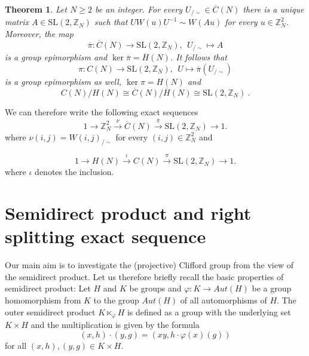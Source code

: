 \documentclass[10pt]{amsart}
\theoremstyle{plain}
\newtheorem{theorem}{Theorem}[section]
\theoremstyle{definition}
\theoremstyle{remark}%
\newcommand{\Z}{\mathbb{Z}}
\newcommand{\Ad}{\mathrm{Ad}}
\newcommand{\SL}{\mathrm{SL}}
\renewcommand{\P}{\mathcal{P}}
\begin{document}
\begin{theorem}\cite{HPPT02}\label{htpp}
Let $N\geq 2$ be an integer. For every $U_{/\sim}\in \overline{C}(N)$ there is a unique matrix $A\in \SL(2,\mathbb{Z}_N)$ such that $UW(u)U^{-1}\sim W(Au)$ for every $u\in\Z_N^2$. Moreover, the map $$\overline{\pi}: \overline{C}(N)\to \SL(2,\mathbb{Z}_N), \ \ U_{/\sim}\mapsto A$$ is a group epimorphism and $\ker \overline{\pi}=\overline{H}(N)$. %
It follows that $$\pi: C(N)\to \SL(2,\mathbb{Z}_N), \ \ U\mapsto \overline{\pi}(U_{/\sim})$$ is a group epimorphism as well, $\ker \pi=H(N)$ and $$C(N)/H(N)\cong\overline{C}(N)/\overline{H}(N)\cong \SL(2,\mathbb{Z}_N)\ .    $$
\end{theorem}
We can therefore write the following exact sequences
\begin{equation} \label{exact1}
     1 \rightarrow \Z_N^2 \stackrel{\nu}{\longrightarrow} \overline{C}(N)
\stackrel{\overline{\pi}}{\longrightarrow} \SL(2,\mathbb{Z}_N)  \rightarrow 1 .
\end{equation}
where $\nu(i,j)=W(i,j)_{/\sim}$ for every $(i,j)\in\Z^2_N$ and

\begin{equation} \label{exact2}
     1 \rightarrow H(N) \stackrel{\iota}{\longrightarrow} C(N)
\stackrel{\pi}{\longrightarrow} \SL(2,\mathbb{Z}_N)  \rightarrow 1 .
\end{equation}
where $\iota$ denotes the inclusion.





\section{Semidirect product and right splitting exact sequence}\label{semidirect}


Our main aim is to investigate the (projective) Clifford group from the view of the semidirect product. Let us therefore briefly recall the basic properties of semidirect product: Let $H$ and $K$ be groups and $\varphi: K\to Aut(H)$ be a group homomorphism from $K$ to the group $Aut(H)$ of all automorphisms of $H$. The outer semidirect product $K\ltimes_{\varphi}H$ is defined as a group with the underlying set $K\times H$ and the multiplication is given by the formula
 $$(x,h)\cdot (y,g)=(xy, h\cdot\varphi(x)(g))$$
 for all $(x,h),(y,g)\in K\times H$.
 
\end{document}
